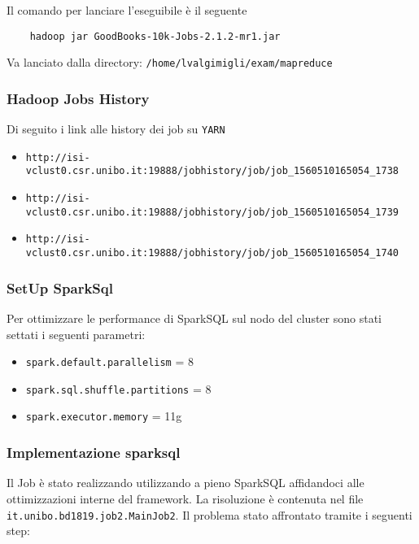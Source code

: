Il comando per lanciare l'eseguibile è il seguente
\begin{verbatim}
    hadoop jar GoodBooks-10k-Jobs-2.1.2-mr1.jar
\end{verbatim}
Va lanciato dalla directory: \texttt{/home/lvalgimigli/exam/mapreduce}

\subsubsection{Hadoop Jobs History}

Di seguito i link alle history dei job su \texttt{YARN}
\begin{itemize}
    \item \texttt{http://isi-vclust0.csr.unibo.it:19888/jobhistory/job/job\_1560510165054\_1738}
    \item \texttt{http://isi-vclust0.csr.unibo.it:19888/jobhistory/job/job\_1560510165054\_1739}
    \item \texttt{http://isi-vclust0.csr.unibo.it:19888/jobhistory/job/job\_1560510165054\_1740}
\end{itemize}

\subsubsection{SetUp SparkSql}
Per ottimizzare le performance di SparkSQL sul nodo del cluster sono stati settati i seguenti parametri:
\begin{itemize}
    \item \texttt{spark.default.parallelism} = 8
    \item \texttt{spark.sql.shuffle.partitions} = 8
    \item \texttt{spark.executor.memory} = 11g
\end{itemize}

\subsubsection{Implementazione sparksql}

Il Job è stato realizzando utilizzando a pieno SparkSQL affidandoci alle ottimizzazioni interne del framework. La risoluzione è contenuta nel file \texttt{it.unibo.bd1819.job2.MainJob2}. Il problema
\è stato affrontato tramite i seguenti step:


